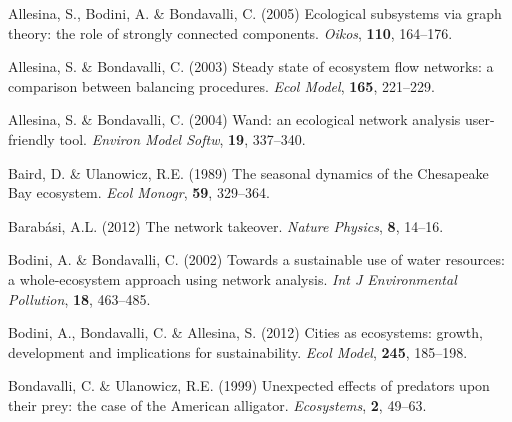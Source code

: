 \documentclass[11pt]{article}
\begin{document}
%
\begin{thebibliography}{75}
\providecommand{\natexlab}[1]{#1}

Allesina, S., Bodini, A. \& Bondavalli, C. (2005) Ecological subsystems via
  graph theory: the role of strongly connected components.
\newblock \emph{Oikos}, \textbf{110}, 164--176.

Allesina, S. \& Bondavalli, C. (2003) Steady state of ecosystem flow networks:
  a comparison between balancing procedures.
\newblock \emph{Ecol Model}, \textbf{165}, 221--229.

Allesina, S. \& Bondavalli, C. (2004) Wand: an ecological network analysis
  user-friendly tool.
\newblock \emph{Environ Model Softw}, \textbf{19}, 337--340.

Baird, D. \& Ulanowicz, R.E. (1989) The seasonal dynamics of the {Chesapeake
  Bay} ecosystem.
\newblock \emph{Ecol Monogr}, \textbf{59}, 329--364.

Barab{\'a}si, A.L. (2012) The network takeover.
\newblock \emph{Nature Physics}, \textbf{8}, 14--16.

Bodini, A. \& Bondavalli, C. (2002) Towards a sustainable use of water
  resources: a whole-ecosystem approach using network analysis.
\newblock \emph{Int J Environmental Pollution}, \textbf{18}, 463--485.

Bodini, A., Bondavalli, C. \& Allesina, S. (2012) Cities as ecosystems: growth,
  development and implications for sustainability.
\newblock \emph{Ecol Model}, \textbf{245}, 185--198.

Bondavalli, C. \& Ulanowicz, R.E. (1999) Unexpected effects of predators upon
  their prey: the case of the {A}merican alligator.
\newblock \emph{Ecosystems}, \textbf{2}, 49--63.


\end{thebibliography}
\end{document}
